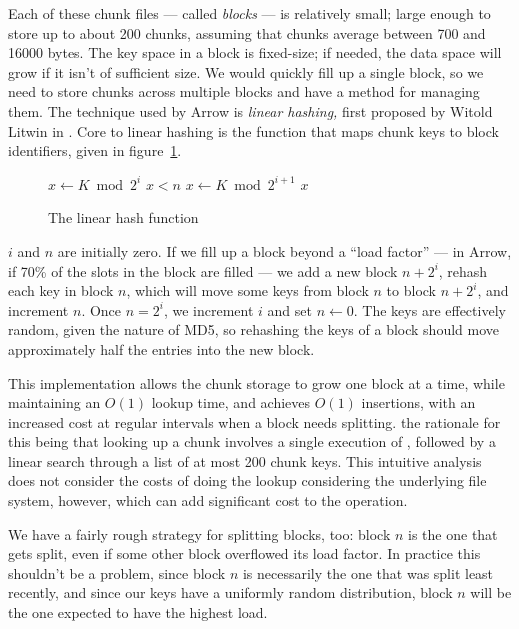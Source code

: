 \documentclass{article}
\begin{document}
Each of these chunk files --- called \emph{blocks} --- is relatively
small; large enough to store up to about 200 chunks, assuming that
chunks average between 700 and 16000 bytes. The key space in a block
is fixed-size; if needed, the data space will grow if it isn't of
sufficient size. We would quickly fill up a single block, so we need
to store chunks across multiple blocks and have a method for managing
them. The technique used by Arrow is \emph{linear hashing,} first
proposed by Witold Litwin in \cite{litwin80}. Core to linear hashing
is the function that maps chunk keys to block identifiers, given in
figure~\ref{proc:linear-hash}.

\begin{figure}[ht!]
\begin{codebox}
\li \( x\gets K \bmod 2^i \)
\li \If \( x < n \)
\li  \Then
\li   \( x \gets K \bmod 2^{i+1} \)
    \End
\li \Return \( x \)
\end{codebox}
\caption{The linear hash function}
\label{proc:linear-hash}
\end{figure}

\( i \) and \( n \) are initially zero. If we fill up a block beyond a
``load factor'' --- in Arrow, if 70\% of the slots in the block are
filled --- we add a new block \( n + 2^i \), rehash each key in block
\( n \), which will move some keys from block \( n \) to block \( n +
2^i \), and increment \( n \). Once \(n = 2^i\), we increment \( i \)
and set \( n\gets 0 \). The keys are effectively random, given the
nature of MD5, so rehashing the keys of a block should move
approximately half the entries into the new block.

This implementation allows the chunk storage to grow one block at a
time, while maintaining an \(O(1)\) lookup time, and achieves \(O(1)\)
insertions, with an increased cost at regular intervals when a block
needs splitting. the rationale for this being that looking up a chunk
involves a single execution of , followed by a
linear search through a list of at most 200 chunk keys. This intuitive
analysis does not consider the costs of doing the lookup considering
the underlying file system, however, which can add significant cost to
the operation.

We have a fairly rough strategy for splitting blocks, too: block \( n
\) is the one that gets split, even if some other block overflowed its
load factor. In practice this shouldn't be a problem, since block \( n
\) is necessarily the one that was split least recently, and since our
keys have a uniformly random distribution, block \( n \) will be the
one expected to have the highest load.
\end{document}
